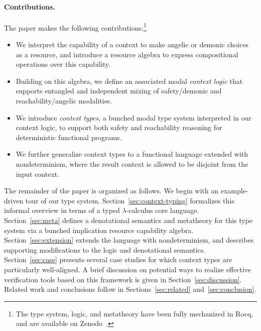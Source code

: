 
\paragraph{Contributions.}
The paper makes the following contributions:\footnote{The type system,
  logic, and metatheory have been fully mechanized in Rocq, and are
  available on Zenodo~\cite{zhe_zhou_2026_23293018}.}
\begin{itemize}[leftmargin=*]
\item We interpret the capability of a context to make angelic or
  demonic choices as a resource, and introduce a resource algebra to
  express compositional operations over this capability.
\item Building on this algebra, we define an associated modal
  \emph{context logic} that supports entangled and independent mixing
  of safety/demonic and reachability/angelic modalities.
\item We introduce \emph{context types}, a bunched modal type system
  interpreted in our context logic, to support both safety and
  reachability reasoning for deterministic functional programs.
\item We further generalize context types to a functional language
  extended with nondeterminism, where the result context is allowed to
  be disjoint from the input context.
\end{itemize}

The remainder of the paper is organized as follows.  We begin with an
example-driven tour of our type system.
Section~\ref{sec:context-typing} formalizes this informal overview in
terms of a typed $\lambda$-calculus core language.
Section~\ref{sec:meta} defines a denotational semantics and metatheory
for this type system via a bunched implication resource capability
algebra.  Section~\ref{sec:extension} extends the language with
nondeterminism, and describes supporting modifications to the logic
and denotational semantics.  Section~\ref{sec:case} presents several
case studies for which context types are particularly well-aligned.  A
brief discussion on potential ways to realize effective verification
tools based on this framework is given in
Section~\ref{sec:discussion}.  Related work and conclusions follow in
Sections~\ref{sec:related} and~\ref{sec:conclusion}.
